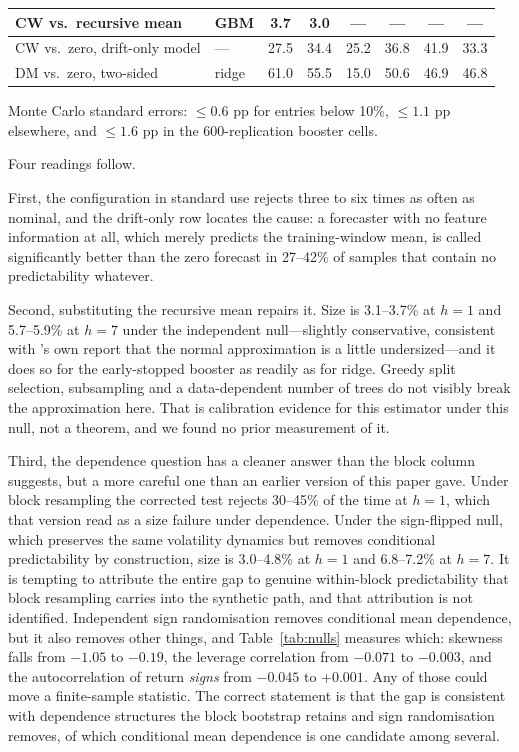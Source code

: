 \documentclass{article}
\theoremstyle{plain}
\theoremstyle{definition}
\begin{document}
\begin{table}[t]
\begin{tabular}{llccc@{\qquad}ccc}
    CW vs.\ recursive mean & GBM         & \textbf{3.7} & \textbf{3.0} & ---  & ---  & ---  & ---  \\
    \midrule
    CW vs.\ zero, drift-only model & --- & 27.5 & 34.4 & 25.2 & 36.8 & 41.9 & 33.3 \\
    DM vs.\ zero, two-sided        & ridge & 61.0 & 55.5 & 15.0 & 50.6 & 46.9 & 46.8 \\
    \bottomrule
  \end{tabular}
  \par\smallskip
  {\footnotesize Monte Carlo standard errors: $\le 0.6$ pp for entries below 10\%,
  $\le 1.1$ pp elsewhere, and $\le 1.6$ pp in the 600-replication booster cells.}
\end{table}

Four readings follow.

First, the configuration in standard use rejects three to six times as often as
nominal, and the drift-only row locates the cause: a forecaster with no feature
information at all, which merely predicts the training-window mean, is called
significantly better than the zero forecast in 27--42\% of samples that contain no
predictability whatever.

Second, substituting the recursive mean repairs it. Size is 3.1--3.7\% at $h=1$ and
5.7--5.9\% at $h=7$ under the independent null---slightly conservative, consistent
with \citet{clark2007}'s own report that the normal approximation is a little
undersized---and it does so for the early-stopped booster as readily as for ridge.
Greedy split selection, subsampling and a data-dependent number of trees do not
visibly break the approximation here. That is calibration evidence for this
estimator under this null, not a theorem, and we found no prior measurement of it.

Third, the dependence question has a cleaner answer than the block column suggests, but a
more careful one than an earlier version of this paper gave. Under block resampling the
corrected test rejects 30--45\% of the time at $h=1$, which that version read as a size
failure under dependence. Under the sign-flipped null, which preserves the same volatility
dynamics but removes conditional predictability by construction, size is 3.0--4.8\% at $h=1$
and 6.8--7.2\% at $h=7$. It is tempting to attribute the entire gap to genuine within-block
predictability that block resampling carries into the synthetic path, and that attribution is
not identified. Independent sign randomisation removes conditional mean dependence, but it
also removes other things, and Table~\ref{tab:nulls} measures which: skewness falls from
$-1.05$ to $-0.19$, the leverage correlation from $-0.071$ to $-0.003$, and the
autocorrelation of return \emph{signs} from $-0.045$ to $+0.001$. Any of those could move a
finite-sample statistic. The correct statement is that the gap is consistent with dependence
structures the block bootstrap retains and sign randomisation removes, of which conditional
mean dependence is one candidate among several.
\end{document}
